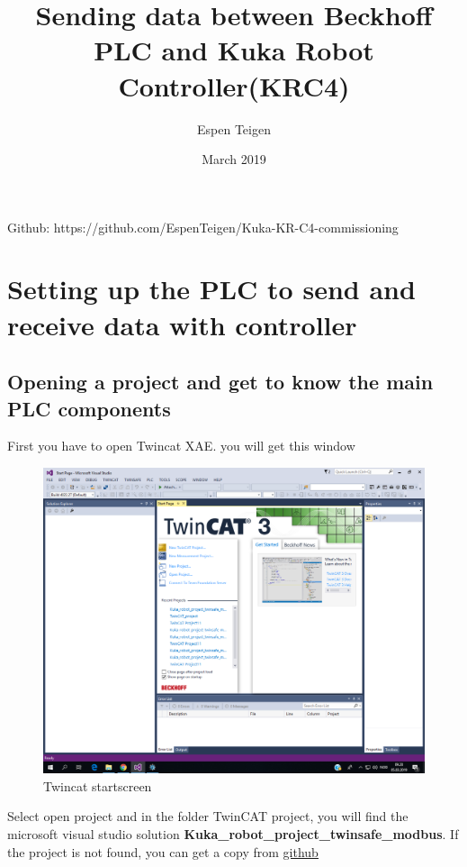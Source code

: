\documentclass{article}
\title{Sending data between Beckhoff PLC and Kuka Robot Controller(KRC4)}
\author{Espen Teigen }
\date{March 2019}
\begin{document}
\maketitle

    Github: https://github.com/EspenTeigen/Kuka-KR-C4-commissioning

\newpage

\tableofcontents{}
\newpage
\section{Setting up the PLC to send and receive data with controller}



\subsection{Opening a project and get to know the main PLC components}
First you have to open Twincat XAE. you will get this window

\begin{figure}[!h]
    \centering
    \includegraphics[width=\textwidth]{pictures/TC3_overview/TC3_startscreen.png}
    \caption{Twincat startscreen}
 
\end{figure}

Select open project and in the folder TwinCAT project, you will find the microsoft visual studio solution \textbf{Kuka\_robot\_project\_twinsafe\_modbus}. If the project is not found, you can get a copy from \href{https://github.com/EspenTeigen/Kuka-KR-C4-commissioning}{\underline{github}}
\end{document}
